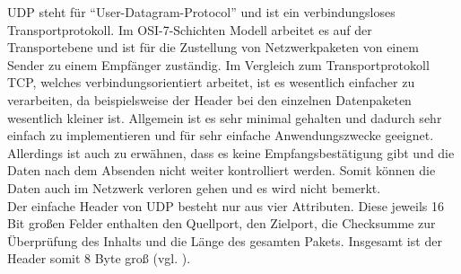 \ac{UDP} steht für ``User-Datagram-Protocol'' und ist ein verbindungsloses Transportprotokoll. Im \ac{OSI}-7-Schichten Modell arbeitet es auf der Transportebene und ist für die Zustellung von Netzwerkpaketen von einem Sender zu einem Empfänger zuständig. Im Vergleich zum Transportprotokoll \ac{TCP}, welches verbindungsorientiert arbeitet, ist es wesentlich einfacher zu verarbeiten, da beispielsweise der Header bei den einzelnen Datenpaketen wesentlich kleiner ist. Allgemein ist es sehr minimal gehalten und dadurch sehr einfach zu implementieren und für sehr einfache Anwendungszwecke geeignet. Allerdings ist auch zu erwähnen, dass es keine Empfangsbestätigung gibt und die Daten nach dem Absenden nicht weiter kontrolliert werden. Somit können die Daten auch im Netzwerk verloren gehen und es wird nicht bemerkt. \\
Der einfache Header von \ac{UDP} besteht nur aus vier Attributen. Diese jeweils 16 Bit großen Felder enthalten den Quellport, den Zielport, die Checksumme zur Überprüfung des Inhalts und die Länge des gesamten Pakets. Insgesamt ist der Header somit 8 Byte groß (vgl. \cite{ElektronikKompendium.}\cite{.}\cite{.23.02.2016}).
 
